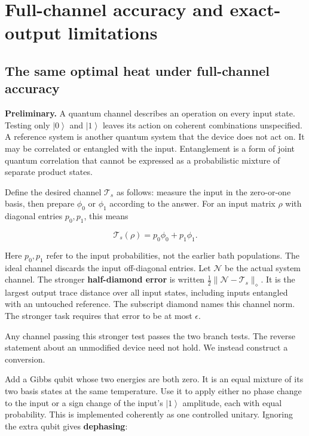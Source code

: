 \documentclass[11pt,letterpaper]{article}
\begin{document}
\section{Full-channel accuracy and exact-output limitations}\label{sec:consequences}

\subsection{The same optimal heat under full-channel accuracy}\label{subsec:channel-accuracy}

\textbf{Preliminary.} A quantum channel describes an operation on every input state. Testing only \(\left| 0 \right\rangle\) and \(\left| 1 \right\rangle\) leaves its action on coherent combinations unspecified. A reference system is another quantum system that the device does not act on. It may be correlated or entangled with the input. Entanglement is a form of joint quantum correlation that cannot be expressed as a probabilistic mixture of separate product states.

Define the desired channel \(\mathcal{T}_{s}\) as follows: measure the input in the zero-or-one basis, then prepare \(\phi_{0}\) or \(\phi_{1}\) according to the answer. For an input matrix \(\rho\) with diagonal entries \(p_{0},p_{1}\), this means

\[\mathcal{T}_{s}(\rho) = p_{0}\phi_{0} + p_{1}\phi_{1}.\]

Here \(p_{0},p_{1}\) refer to the input probabilities, not the earlier bath populations. The ideal channel discards the input off-diagonal entries. Let \(\mathcal{N}\) be the actual system channel. The stronger \textbf{half-diamond error} is written \(\tfrac{1}{2}\lVert\mathcal{N}-\mathcal{T}_{s}\rVert_{\diamond}\). It is the largest output trace distance over all input states, including inputs entangled with an untouched reference. The subscript diamond names this channel norm. The stronger task requires that error to be at most \(\epsilon\).

Any channel passing this stronger test passes the two branch tests. The reverse statement about an unmodified device need not hold. We instead construct a conversion.

Add a Gibbs qubit whose two energies are both zero. It is an equal mixture of its two basis states at the same temperature. Use it to apply either no phase change to the input or a sign change of the input's \(\left| 1 \right\rangle\) amplitude, each with equal probability. This is implemented coherently as one controlled unitary. Ignoring the extra qubit gives \textbf{dephasing}:
\end{document}
